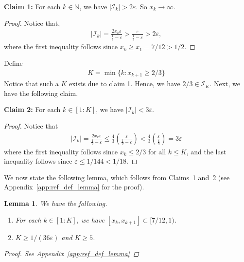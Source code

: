 \documentclass[12pt,draftcls, onecolumn]{IEEEtran}
\newtheorem{lemma}{Lemma}
\begin{document}
\noindent
\textbf{Claim 1:} For each $k \in \mathbb{N}$, we have $|\mathcal{I}_k| > 2\varepsilon$. So $x_k \rightarrow \infty$.
\begin{proof}
    Notice that,
       \begin{align}
           |\mathcal{I}_k| = \frac{2x_k\varepsilon}{\frac{1}{2}-\varepsilon} > \frac{\varepsilon}{\frac{1}{2}-\varepsilon} > 2\varepsilon, \nonumber
       \end{align}
       where the first inequality follows since $x_k \geq x_1 = 7/12 > 1/2$.
\end{proof}
Define
\begin{align}\label{eqn:K_def}
    K = \min\{k:x_{k+1} \geq 2/3\} 
\end{align}
Notice that such a $K$ exists due to claim 1. Hence, we have $2/3 \in \mathcal{I}_K$. Next, we have the following claim.

\noindent
\textbf{Claim 2:} For each $k \in [1:K]$, we have $|\mathcal{I}_k| < 3\varepsilon $.
\begin{proof}
Notice that
\begin{align}
   |\mathcal{I}_k| = \frac{2x_k\varepsilon}{\frac{1}{2}-\varepsilon} \leq \frac{4}{3}\left(\frac{\varepsilon}{\frac{1}{2}-\varepsilon}\right) < \frac{4}{3}\left(\frac{\varepsilon}{\frac{4}{9}}\right) = 3\varepsilon \nonumber
\end{align}
where the first inequality follows since $x_k \leq 2/3$ for all $k \leq K$, and the last inequality follows since $\varepsilon \leq 1/144 <  1/18$. 
\end{proof}
We now state the following lemma, which follows from Claims~1 and~2 (see Appendix~\ref{app:ref_def_lemma} for the proof).
\begin{lemma}\label{lemma:ref_def_lemma}
    We have the following.
    \begin{enumerate}
        \item For each $k \in [1:K]$, we have $[x_k,x_{k+1}] \subset [7/12,1)$.
        \item $K \geq 1/(36\varepsilon)$ and $K \geq 5$.  
    \end{enumerate}
    \begin{proof}
       See Appendix~\ref{app:ref_def_lemma}
    \end{proof}
\end{lemma}
\end{document}
